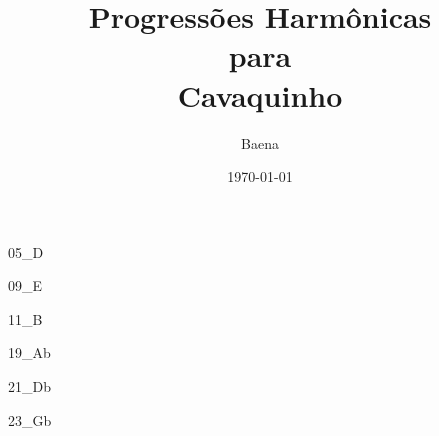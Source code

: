 \documentclass[fontsize=14pt,a4paper,landscape,DIV=9]{scrartcl}
\begin{document}
\title{\textbf{\Huge Progressões Harmônicas\\ \vspace{1cm} para\\ \vspace{1cm} Cavaquinho}}
\author{Baena}
\date{\today}
\maketitle
\thispagestyle{empty}
\newpage

\setcounter{page}{1}

\begin{multicols}{2}
\tableofcontents
\end{multicols}

\cleardoublepage
{}
\setcounter{page}{3}







{05_D}




{09_E}


{11_B}








{19_Ab}


{21_Db}


{23_Gb}
\end{document}
